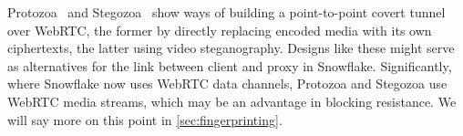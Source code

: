 \documentclass[letterpaper,twocolumn]{article}
\begin{document}
Protozoa~\cite{Barradas2020a}
and Stegozoa~\cite{Figueira2022a}
show ways of building a point-to-point covert tunnel over WebRTC,
the former by directly replacing encoded media
with its own ciphertexts,
the latter using video steganography.
Designs like these might serve as alternatives
for the link between client and proxy in Snowflake.
Significantly, where Snowflake now uses WebRTC data channels,
Protozoa and Stegozoa use WebRTC media streams,
which may be an advantage in blocking resistance.
We will say more on this point in \autoref{sec:fingerprinting}.


\end{document}
